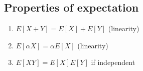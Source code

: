 \subsection{Properties of expectation}
    \begin{definition}
        
        \begin{enumerate}
            \item $E[X+Y] = E[X] + E[Y]$ (linearity)
            \item $E[\alpha X] = \alpha E[X]$ (linearity)
            \item $E[XY] = E[X]E[Y]$ if independent
        \end{enumerate}
    \end{definition}